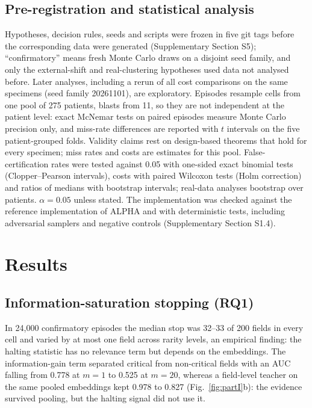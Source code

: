 \documentclass[preprint,12pt]{elsarticle}
\theoremstyle{remark}
\theoremstyle{definition}
\begin{document}
\subsection{Pre-registration and statistical analysis}
Hypotheses, decision rules, seeds and scripts were frozen in five git tags before the corresponding data were generated (Supplementary Section S5); ``confirmatory'' means fresh Monte Carlo draws on a disjoint seed family, and only the external-shift and real-clustering hypotheses used data not analysed before. Later analyses, including a rerun of all cost comparisons on the same specimens (seed family 20261101), are exploratory. Episodes resample cells from one pool of 275 patients, blasts from 11, so they are not independent at the patient level: exact McNemar tests on paired episodes measure Monte Carlo precision only, and miss-rate differences are reported with $t$ intervals on the five patient-grouped folds. Validity claims rest on design-based theorems that hold for every specimen; miss rates and costs are estimates for this pool. False-certification rates were tested against 0.05 with one-sided exact binomial tests (Clopper--Pearson intervals), costs with paired Wilcoxon tests (Holm correction) and ratios of medians with bootstrap intervals; real-data analyses bootstrap over patients. $\alpha=0.05$ unless stated. The implementation was checked against the reference implementation of ALPHA and with deterministic tests, including adversarial samplers and negative controls (Supplementary Section S1.4).

\section{Results}
\subsection{Information-saturation stopping (RQ1)}\label{sec:partI}
In 24,000 confirmatory episodes the median stop was 32--33 of 200 fields in every cell and varied by at most one field across rarity levels, an empirical finding: the halting statistic has no relevance term but depends on the embeddings. The information-gain term separated critical from non-critical fields with an AUC falling from 0.778 at $m=1$ to 0.525 at $m=20$, whereas a field-level teacher on the same pooled embeddings kept 0.978 to 0.827 (Fig.~\ref{fig:partI}b): the evidence survived pooling, but the halting signal did not use it.
\end{document}
